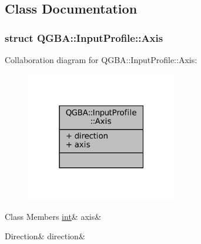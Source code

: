 \subsection{Class Documentation}
\label{struct_q_g_b_a_1_1_input_profile_1_1_axis}
\subsubsection{struct Q\+G\+BA\+:\+:Input\+Profile\+:\+:Axis}


Collaboration diagram for Q\+G\+BA\+:\+:Input\+Profile\+:\+:Axis\+:
\nopagebreak
\begin{figure}[H]
\begin{center}
\leavevmode
\includegraphics[width=187pt]{struct_q_g_b_a_1_1_input_profile_1_1_axis__coll__graph}
\end{center}
\end{figure}
\begin{DoxyFields}{Class Members}
\mbox{\label{class_q_g_b_a_1_1_input_profile_ac1534f4fd8f67b596279b0b1f4cebaee}} 
\mbox{\hyperlink{ioapi_8h_a787fa3cf048117ba7123753c1e74fcd6}{int}}&
axis&
\\
\hline

\mbox{\label{class_q_g_b_a_1_1_input_profile_aaa68b4ff371a9380d2eeeb90fa583deb}} 
Direction&
direction&
\\
\hline

\end{DoxyFields}
\label{struct_q_g_b_a_1_1_input_profile_1_1_axis_value}
